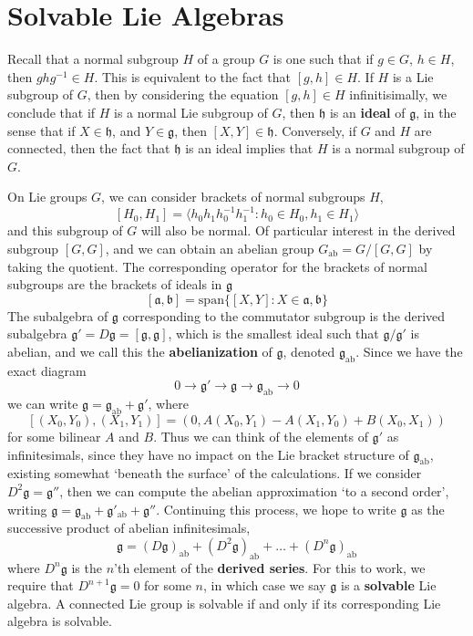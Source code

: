 \section{Solvable Lie Algebras}

Recall that a normal subgroup $H$ of a group $G$ is one such that if $g \in G$, $h \in H$, then $ghg^{-1} \in H$. This is equivalent to the fact that $[g,h] \in H$. If $H$ is a Lie subgroup of $G$, then by considering the equation $[g,h] \in H$ infinitisimally, we conclude that if $H$ is a normal Lie subgroup of $G$, then $\mathfrak{h}$ is an {\bf ideal} of $\mathfrak{g}$, in the sense that if $X \in \mathfrak{h}$, and $Y \in \mathfrak{g}$, then $[X,Y] \in \mathfrak{h}$. Conversely, if $G$ and $H$ are connected, then the fact that $\mathfrak{h}$ is an ideal implies that $H$ is a normal subgroup of $G$.

On Lie groups $G$, we can consider brackets of normal subgroups $H$,
%
\[ [H_0,H_1] = \langle h_0h_1h_0^{-1}h_1^{-1} : h_0 \in H_0, h_1 \in H_1 \rangle \]
%
and this subgroup of $G$ will also be normal. Of particular interest in the derived subgroup $[G,G]$, and we can obtain an abelian group $G_{\text{ab}} = G/[G,G]$ by taking the quotient. The corresponding operator for the brackets of normal subgroups are the brackets of ideals in $\mathfrak{g}$
%
\[ [\mathfrak{a}, \mathfrak{b}] = \text{span} \{ [X,Y] : X \in \mathfrak{a}, \mathfrak{b} \} \]
%
The subalgebra of $\mathfrak{g}$ corresponding to the commutator subgroup is the derived subalgebra $\mathfrak{g}' = D\mathfrak{g} = [\mathfrak{g}, \mathfrak{g}]$, which is the smallest ideal such that $\mathfrak{g}/\mathfrak{g}'$ is abelian, and we call this the {\bf abelianization} of $\mathfrak{g}$, denoted $\mathfrak{g}_{\text{ab}}$. Since we have the exact diagram
%
\[ 0 \to \mathfrak{g}' \to \mathfrak{g} \to \mathfrak{g}_{\text{ab}} \to 0 \]
%
we can write $\mathfrak{g} = \mathfrak{g}_{\text{ab}} + \mathfrak{g}'$, where
%
\[ [(X_0,Y_0),(X_1,Y_1)] = (0, A(X_0,Y_1) - A(X_1,Y_0) + B(X_0,X_1)) \]
%
for some bilinear $A$ and $B$. Thus we can think of the elements of $\mathfrak{g}'$ as infinitesimals, since they have no impact on the Lie bracket structure of $\mathfrak{g}_{\text{ab}}$, existing somewhat `beneath the surface' of the calculations. If we consider $D^2 \mathfrak{g} = \mathfrak{g}''$, then we can compute the abelian approximation `to a second order', writing $\mathfrak{g} = \mathfrak{g}_{\text{ab}} + \mathfrak{g}'_{\text{ab}} + \mathfrak{g}''$. Continuing this process, we hope to write $\mathfrak{g}$ as the successive product of abelian infinitesimals,
%
\[ \mathfrak{g} = (D\mathfrak{g})_{\text{ab}} + (D^2 \mathfrak{g})_{\text{ab}} + \dots + (D^n \mathfrak{g})_{\text{ab}} \]
%
where $D^n \mathfrak{g}$ is the $n$'th element of the {\bf derived series}. For this to work, we require that $D^{n+1} \mathfrak{g} = 0$ for some $n$, in which case we say $\mathfrak{g}$ is a {\bf solvable} Lie algebra. A connected Lie group is solvable if and only if its corresponding Lie algebra is solvable.

